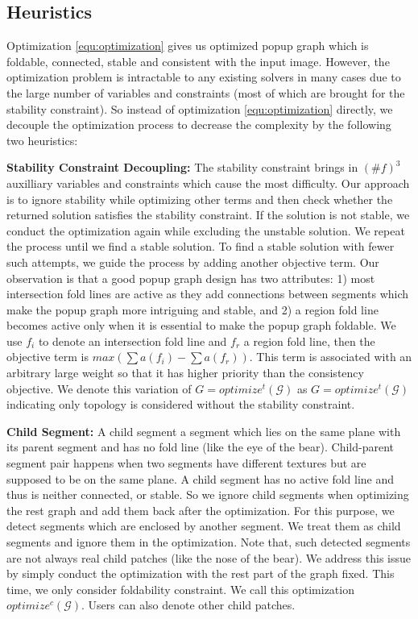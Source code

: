 \subsection{Heuristics}

Optimization \ref{equ:optimization} gives us optimized popup graph which is foldable, connected, stable and consistent with the input image. However, the optimization problem is intractable to any existing solvers in many cases due to the large number of variables and constraints (most of which are brought for the stability constraint). So instead of optimization \ref{equ:optimization} directly, we decouple the optimization process to decrease the complexity by the following two heuristics:

\textbf{Stability Constraint Decoupling: }
The stability constraint brings in $(\#f)^3$ auxilliary variables and constraints which cause the most difficulty. Our approach is to ignore stability while optimizing other terms and then check whether the returned solution satisfies the stability constraint. If the solution is not stable, we conduct the optimization again while excluding the unstable solution. We repeat the process until we find a stable solution. To find a stable solution with fewer such attempts, we guide the process by adding another objective term. Our observation is that a good popup graph design has two attributes: 1) most intersection fold lines are active as they add connections between segments which make the popup graph more intriguing and stable, and 2) a region fold line becomes active only when it is essential to make the popup graph foldable. We use $f_i$ to denote an intersection fold line and $f_r$ a region fold line, then the objective term is $max(\sum{a(f_i)} - \sum{a(f_r)})$. This term is associated with an arbitrary large weight so that it has higher priority than the consistency objective. We denote this variation of $G = optimize^t(\mathcal{G})$ as $G = optimize^t(\mathcal{G})$ indicating only topology is considered without the stability constraint.

\textbf{Child Segment: }
A child segment a segment which lies on the same plane with its parent segment and has no fold line (like the eye of the bear). Child-parent segment pair happens when two segments have different textures but are supposed to be on the same plane. A child segment has no active fold line and thus is neither connected, or stable. So we ignore child segments when optimizing the rest graph and add them back after the optimization. For this purpose, we detect segments which are enclosed by another segment. We treat them as child segments and ignore them in the optimization. Note that, such detected segments are not always real child patches (like the nose of the bear). We address this issue by simply conduct the optimization with the rest part of the graph fixed. This time, we only consider foldability constraint. We call this optimization $optimize^c(\mathcal{G})$. Users can also denote other child patches.

